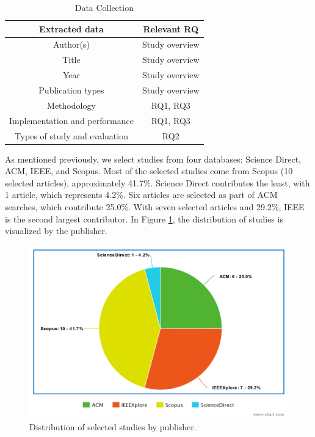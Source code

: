 \documentclass[a4paper,12pt]{article}
\begin{document}
\begin{center}
\begin{table}[ht]
\caption{Data Collection}
\label{Data Collection}
\begin{center}
\begin{tabular}{|c|c|}
\rowcolor[HTML]{00D2CB} 
\hline
Extracted data & Relevant RQ\\
\hline

Author(s) &  Study overview  \\
Title &  Study overview  \\
Year & Study overview  \\
Publication types  &  Study overview   \\
Methodology &  RQ1, RQ3  \\
Implementation and performance  & RQ1, RQ3  \\
Types of study and evaluation  &  RQ2  \\

\hline

\end{tabular}
\end{center}
\end{table}
\end{center}
\newpage

As mentioned previously, we select studies from four databases: Science Direct, ACM, IEEE, and Scopus. Most of the selected studies come from Scopus (10 selected articles), approximately 41.7\%. Science Direct contributes the least, with 1 article, which represents 4.2\%. Six articles are selected as part of ACM searches, which contribute 25.0\%. With seven selected articles and 29.2\%, IEEE is the second largest contributor. In Figure \ref{fig:Publishers}, the distribution of studies is visualized by the publisher. 

\begin{figure}[H]
\centering
\includegraphics*[width=1\columnwidth]{img/Publishers}
\caption{Distribution of selected studies by publisher.}
\label{fig:Publishers}
\end{figure}
\end{document}
